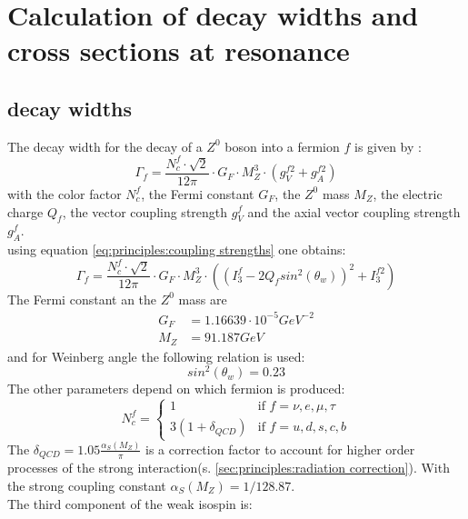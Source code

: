 \section{Calculation of decay widths and cross sections at resonance}
\subsection{decay widths}
The decay width for the decay of a $Z^0$ boson into a fermion $f$ is given by \cite{muenchen}:
\begin{equation}
\Gamma_f=\frac{N_c^f \cdot \sqrt{2}}{12\pi}\cdot G_F \cdot M_Z^3 \cdot (g_V^{f2}+g_A^{f2})
\end{equation}
with the color factor $N_c^f$, the Fermi constant $G_F$, the $Z^0$ mass $M_Z$, the electric charge $Q_f$, the vector coupling strength $g_V^f$ and the axial vector coupling strength $g_A^f$.\\
using equation \ref{eq:principles:coupling strengths} one obtains:
\begin{equation}
\Gamma_f=\frac{N_c^f \cdot \sqrt{2}}{12\pi}\cdot G_F \cdot M_Z^3 \cdot \left( \left( I^f_3-2 Q_f sin^2(\theta_w)\right)^2+I^{f2}_3 \right)
\label{eq:appendix:decay width}
\end{equation}
The Fermi constant an the  $Z^0$ mass are\cite{muenchen}
\begin{equation}
\begin{aligned}
G_F &= 1.16639\cdot 10^{-5}GeV^{-2}\\
M_Z &= 91.187 GeV
\end{aligned}
\end{equation}
and for Weinberg angle the following relation is used\cite{Grif}:
\begin{equation}
sin^2(\theta_w)=0.23 
\end{equation}
The other parameters depend on which fermion is produced:
\begin{equation}
N_c^f = \begin{cases}
1 & \text{if } f = \nu,e,\mu,\tau\\
3(1+\delta_{QCD}) & \text{if } f = u,d,s,c,b
\end{cases}
\end{equation}
The $\delta_{QCD}= 1.05 \frac{\alpha_S(M_Z)}{\pi}$ is a correction factor to account  for higher order processes of the strong interaction(s. \ref{sec:principles:radiation correction}). With the strong coupling constant $\alpha_S(M_Z)=1/128.87$.\\
The third component of the weak isospin is:
